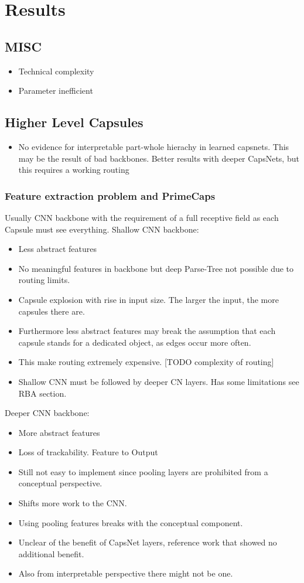\documentclass{article}
\begin{document}
\section{Results}

\subsection*{MISC}
\begin{itemize}
	\item Technical complexity
	\item Parameter inefficient
\end{itemize}
\subsection*{Higher Level Capsules}
\begin{itemize}
	\item  No evidence for interpretable part-whole hierachy in learned capsnets. This may be the result of bad backbones. Better results with deeper CapsNets, but this requires a working routing
\end{itemize}
\subsubsection*{Feature extraction problem and PrimeCaps}
Usually CNN backbone with the requirement of a full receptive field as each Capsule must see everything.
Shallow CNN backbone:
\begin{itemize}
	\item Less abstract features
	\item No meaningful features in backbone but deep Parse-Tree not possible due to routing limits.
	\item Capsule explosion with rise in input size. The larger the input, the more capsules there are.
	\item Furthermore less abstract features may break the assumption that each capsule stands for a dedicated object, as edges occur more often.
	\item This make routing extremely expensive. [TODO complexity of routing]
	\item Shallow CNN must be followed by deeper CN layers. Has some limitations see RBA section.
\end{itemize}

Deeper CNN backbone:
\begin{itemize}
	\item More abstract features
	\item Loss of trackability. Feature to Output
	\item Still not easy to implement since pooling layers are prohibited from a conceptual perspective.
	\item Shifts more work to the CNN.
	\item Using pooling features breaks with the conceptual component.
	\item Unclear of the benefit of CapsNet layers, reference work that showed no additional benefit.
	\item Also from interpretable perspective there might not be one.
\end{itemize}
\end{document}
